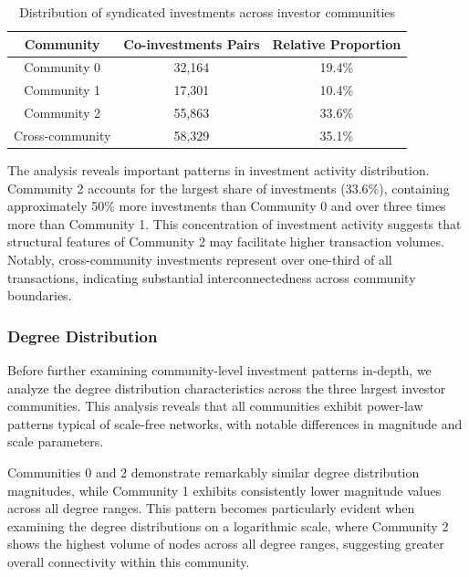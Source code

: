 \begin{table}[htbp]
\centering
\begin{tabular}{|c|c|c|}
\hline
\textbf{Community} & \textbf{Co-investments Pairs} & \textbf{Relative Proportion} \\
\hline
Community 0 & 32,164 & 19.4\% \\
Community 1 & 17,301 & 10.4\% \\
Community 2 & 55,863 & 33.6\% \\
Cross-community & 58,329 & 35.1\% \\
\hline
\end{tabular}
\caption{Distribution of syndicated investments across investor communities}
\label{tab:investment_distribution}
\end{table}

The analysis reveals important patterns in investment activity distribution. Community 2 accounts for the largest share of investments (33.6\%), containing approximately 50\% more investments than Community 0 and over three times more than Community 1. This concentration of investment activity suggests that structural features of Community 2 may facilitate higher transaction volumes. Notably, cross-community investments represent over one-third of all transactions, indicating substantial interconnectedness across community boundaries.

\subsubsection{Degree Distribution}

Before further examining community-level investment patterns in-depth, we analyze the degree distribution characteristics across the three largest investor communities. This analysis reveals that all communities exhibit power-law patterns typical of scale-free networks, with notable differences in magnitude and scale parameters.

Communities 0 and 2 demonstrate remarkably similar degree distribution magnitudes, while Community 1 exhibits consistently lower magnitude values across all degree ranges. This pattern becomes particularly evident when examining the degree distributions on a logarithmic scale, where Community 2 shows the highest volume of nodes across all degree ranges, suggesting greater overall connectivity within this community.


